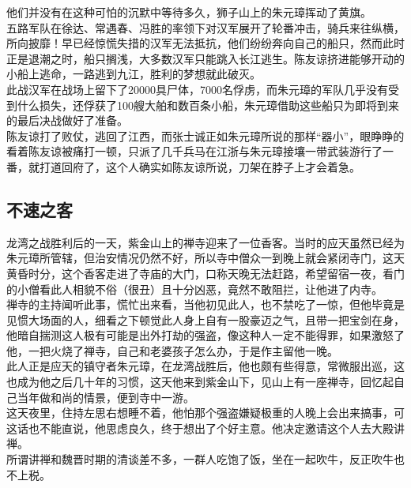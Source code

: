 \begin{multicols}{\theparacolNo}
他们并没有在这种可怕的沉默中等待多久，狮子山上的朱元璋挥动了黄旗。\\

五路军队在徐达、常遇春、冯胜的率领下对汉军展开了轮番冲击，骑兵来往纵横，所向披靡！早已经惊慌失措的汉军无法抵抗，他们纷纷奔向自己的船只，然而此时正是退潮之时，船只搁浅，大多数汉军只能跳入长江逃生。陈友谅挤进能够开动的小船上逃命，一路逃到九江，胜利的梦想就此破灭。\\

此战汉军在战场上留下了20000具尸体，7000名俘虏，而朱元璋的军队几乎没有受到什么损失，还俘获了100艘大舶和数百条小船，朱元璋借助这些船只为即将到来的最后决战做好了准备。\\

陈友谅打了败仗，逃回了江西，而张士诚正如朱元璋所说的那样“器小”，眼睁睁的看着陈友谅被痛打一顿，只派了几千兵马在江浙与朱元璋接壤一带武装游行了一番，就打道回府了，这个人确实如陈友谅所说，刀架在脖子上才会着急。\\

\subsection{不速之客}
龙湾之战胜利后的一天，紫金山上的禅寺迎来了一位香客。当时的应天虽然已经为朱元璋所管辖，但治安情况仍然不好，所以寺中僧众一到晚上就会紧闭寺门，这天黄昏时分，这个香客走进了寺庙的大门，口称天晚无法赶路，希望留宿一夜，看门的小僧看此人相貌不俗（很丑）且十分凶恶，竟然不敢阻拦，让他进了内寺。\\

禅寺的主持闻听此事，慌忙出来看，当他初见此人，也不禁吃了一惊，但他毕竟是见惯大场面的人，细看之下顿觉此人身上自有一股豪迈之气，且带一把宝剑在身，他暗自揣测这人极有可能是出外打劫的强盗，像这种人一定不能得罪，如果激怒了他，一把火烧了禅寺，自己和老婆孩子怎么办，于是作主留他一晚。\\

此人正是应天的镇守者朱元璋，在龙湾战胜后，他也颇有些得意，常微服出巡，这也成为他之后几十年的习惯，这天他来到紫金山下，见山上有一座禅寺，回忆起自己当年做和尚的情景，便到寺中一游。\\

这天夜里，住持左思右想睡不着，他怕那个强盗嫌疑极重的人晚上会出来搞事，可这话也不能直说，他思虑良久，终于想出了个好主意。他决定邀请这个人去大殿讲禅。\\

所谓讲禅和魏晋时期的清谈差不多，一群人吃饱了饭，坐在一起吹牛，反正吹牛也不上税。\\


\end{multicols}
